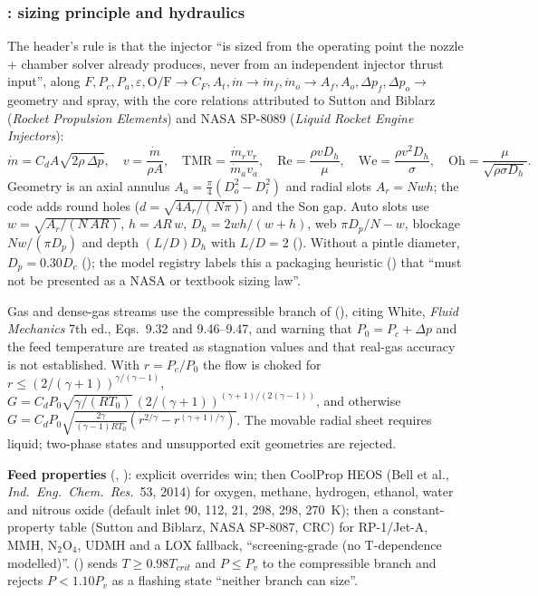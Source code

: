 \subsubsection*{: sizing principle and hydraulics}

The header's rule is that the injector ``is sized from the operating point the
nozzle + chamber solver already produces, never from an independent injector
thrust input'', along
$F,P_c,P_a,\varepsilon,\mathrm{O/F}\rightarrow C_F,A_t,\dot m\rightarrow\dot m_f,\dot m_o
\rightarrow A_f,A_o,\Delta p_f,\Delta p_o\rightarrow$ geometry and spray, with the
core relations attributed to Sutton and Biblarz (\emph{Rocket Propulsion
Elements}) and NASA SP-8089 (\emph{Liquid Rocket Engine Injectors}):
\begin{equation*}
\dot m = C_d A\sqrt{2\rho\,\Delta p},\quad v=\frac{\dot m}{\rho A},\quad
\mathrm{TMR}=\frac{\dot m_r v_r}{\dot m_a v_a},\quad
\mathrm{Re}=\frac{\rho v D_h}{\mu},\quad
\mathrm{We}=\frac{\rho v^2 D_h}{\sigma},\quad
\mathrm{Oh}=\frac{\mu}{\sqrt{\rho\sigma D_h}} .
\end{equation*}
Geometry is an axial annulus $A_a=\tfrac{\pi}{4}(D_o^2-D_i^2)$ and radial slots
$A_r=Nwh$; the code adds round holes ($d=\sqrt{4A_r/(N\pi)}$) and the Son gap.
Auto slots use $w=\sqrt{A_r/(N\,AR)}$, $h=AR\,w$, $D_h=2wh/(w+h)$,
web $\pi D_p/N-w$, blockage $Nw/(\pi D_p)$ and depth $(L/D)D_h$ with $L/D=2$
(). Without a pintle diameter, $D_p=0.30D_c$ (); the
model registry labels this a packaging heuristic () that
``must not be presented as a NASA or textbook sizing law''.

Gas and dense-gas streams use the compressible branch of 
(), citing White, \emph{Fluid Mechanics} 7th ed., Eqs.~9.32 and
9.46--9.47, and warning that $P_0=P_c+\Delta p$ and the feed temperature are
treated as stagnation values and that real-gas accuracy is not established. With
$r=P_c/P_0$ the flow is choked for $r\le(2/(\gamma+1))^{\gamma/(\gamma-1)}$,
$G=C_dP_0\sqrt{\gamma/(RT_0)}\,(2/(\gamma+1))^{(\gamma+1)/(2(\gamma-1))}$, and
otherwise $G=C_dP_0\sqrt{\tfrac{2\gamma}{(\gamma-1)RT_0}(r^{2/\gamma}-r^{(\gamma+1)/\gamma})}$.
The movable radial sheet requires liquid; two-phase states and unsupported exit
geometries are rejected.

\textbf{Feed properties} (, ): explicit
overrides win; then CoolProp HEOS (Bell et al., \emph{Ind.\ Eng.\ Chem.\ Res.}\ 53,
2014) for oxygen, methane, hydrogen, ethanol, water and nitrous oxide (default
inlet 90, 112, 21, 298, 298, 270~K); then a constant-property table (Sutton and
Biblarz, NASA SP-8087, CRC) for RP-1/Jet-A, MMH, N$_2$O$_4$, UDMH and a LOX
fallback, ``screening-grade (no T-dependence modelled)''. 
() sends $T\ge0.98T_{crit}$ and $P\le P_v$ to the compressible branch
and rejects $P<1.10P_v$ as a flashing state ``neither branch can size''.

